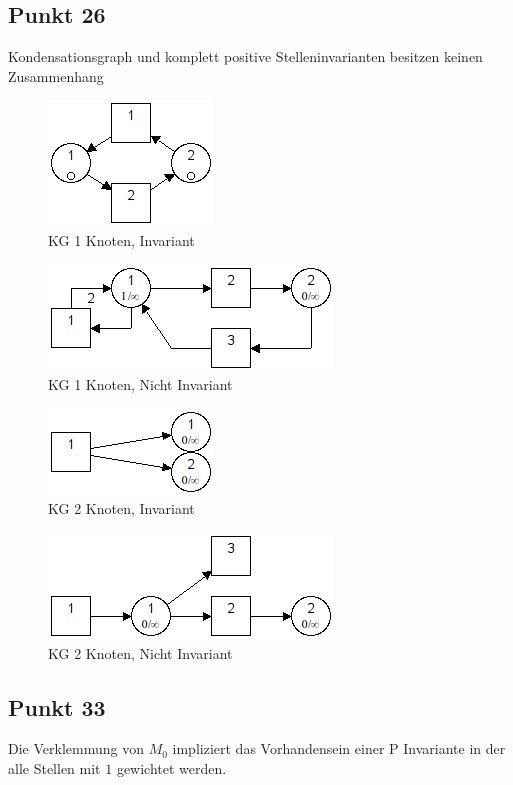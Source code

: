 \documentclass[10pt]{scrartcl}
\begin{document}
				\subsection{Punkt 26}
				Kondensationsgraph und komplett positive Stelleninvarianten besitzen keinen Zusammenhang
				\begin{figure}[H]
    				\centering	
					\includegraphics[scale=0.5]{aufg0261.png}		
            		\caption{KG 1 Knoten, Invariant}
				\end{figure}
				\begin{figure}[H]
    				\centering	
					\includegraphics[scale=0.5]{aufg0262.png}		
            		\caption{KG 1 Knoten, Nicht Invariant}
				\end{figure}
				\begin{figure}[H]
    				\centering	
					\includegraphics[scale=0.5]{aufg0263.png}		
            		\caption{KG 2 Knoten, Invariant}
				\end{figure}
				\begin{figure}[H]
    				\centering	
					\includegraphics[scale=0.5]{aufg0264.png}		
            		\caption{KG 2 Knoten, Nicht Invariant}
				\end{figure}
				
				\subsection{Punkt 33}
				Die Verklemmung von $M_0$ impliziert das Vorhandensein einer P Invariante in der alle Stellen mit $1$ gewichtet werden.
				
\end{document}
